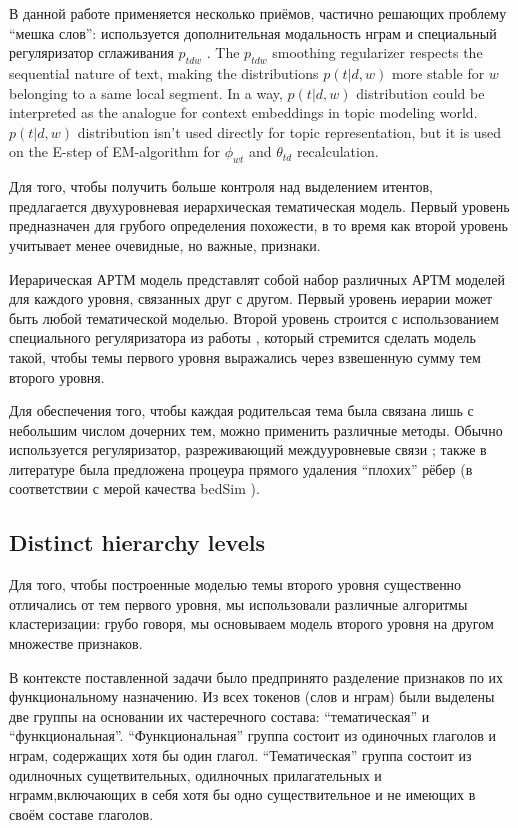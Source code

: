 
В данной работе применяется несколько приёмов, частично решающих проблему ``мешка слов'': используется дополнительная модальность нграм и специальный регуляризатор сглаживания $p_{tdw}$  \cite{ptdw}.
The $p_{tdw}$ smoothing regularizer respects the sequential nature of text, making the distributions $p(t|d, w)$ more stable for $w$ belonging to a same local segment. In a way, $p(t|d, w)$ distribution could be interpreted as the analogue for context embeddings in topic modeling world. $p(t|d, w)$ distribution isn't used directly for topic representation, but it is used on the E-step of EM-algorithm for $\phi_{wt}$ and $\theta_{td}$ recalculation.

Для того, чтобы получить больше контроля над выделением итентов, предлагается двухуровневая иерархическая тематическая модель. Первый уровень предназначен для грубого определения похожести, в то время как второй уровень учитывает менее очевидные, но важные, признаки. 

Иерарическая АРТМ модель представлят собой набор различных АРТМ моделей для каждого уровня, связанных друг с другом. Первый уровень иерарии может быть любой тематической моделью. Второй уровень строится с использованием специального регуляризатора из работы \cite{chirkova2016additive}, который стремится сделать модель такой, чтобы темы первого уровня выражались через взвешенную сумму тем второго уровня. 

Для обеспечения того, чтобы каждая родительсая тема была связана лишь с небольшим числом дочерних тем, можно применить различные методы. Обычно используется регуляризатор, разреживающий междууровневые связи \cite{chirkova2016additive} ; также в литературе была предложена процеура прямого удаления ``плохих'' рёбер (в соответствии с мерой качества bedSim \cite{belyy}).

\subsection{Distinct hierarchy levels} \label{hierarchy_ distinct}

Для того, чтобы построенные моделью темы второго уровня существенно отличались от тем первого уровня, мы использовали различные алгоритмы кластеризации: грубо говоря, мы основываем модель второго уровня на другом множестве признаков.

В контексте поставленной задачи было предпринято разделение признаков по их функциональному назначению. Из всех токенов (слов и нграм) были выделены две группы на основании их частеречного состава: ``тематическая'' и ``функциональная''. ``Функциональная'' группа состоит из одиночных глаголов и нграм, содержащих хотя бы один глагол. ``Тематическая'' группа состоит из одилночных сущетвительных, одилночных прилагательных и нграмм,включающих в себя хотя бы одно существительное и не имеющих в своём составе глаголов.

